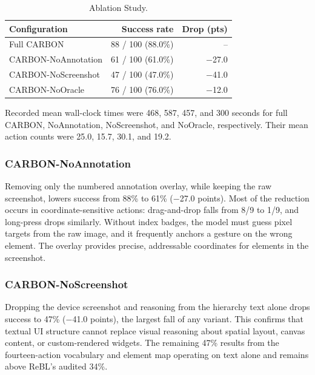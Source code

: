 \documentclass[10pt,conference,a4paper]{IEEEtran}
\begin{document}
  \begin{table}[t]
  \caption{Ablation Study.}
  \label{tab:ablation}
  \centering
  \small
  \setlength{\tabcolsep}{4pt}
  \renewcommand{\arraystretch}{1.25}
  \begin{tabular*}{\columnwidth}{@{\extracolsep{\fill}}lrr@{}}
  \toprule
  \textbf{Configuration} & \textbf{Success rate} & \textbf{Drop (pts)} \\
  \midrule
  Full CARBON              & 88 / 100 (88.0\%) & -- \\
  \quad CARBON-NoAnnotation & 61 / 100 (61.0\%) & $-$27.0 \\
  \quad CARBON-NoScreenshot & 47 / 100 (47.0\%) & $-$41.0 \\
  \quad CARBON-NoOracle     & 76 / 100 (76.0\%) & $-$12.0 \\
  \bottomrule
  \end{tabular*}
  \end{table}

  Recorded mean wall-clock times were 468, 587, 457, and 300 seconds for
  full CARBON, NoAnnotation, NoScreenshot, and NoOracle, respectively. Their
  mean action counts were 25.0, 15.7, 30.1, and 19.2.

  \subsubsection{CARBON-NoAnnotation}
  Removing only the numbered annotation overlay, while keeping the raw
  screenshot, lowers success from 88\% to 61\% ($-$27.0 points). Most of
  the reduction occurs in coordinate-sensitive actions: drag-and-drop falls from
  8/9 to 1/9, and long-press drops similarly. Without index badges, the
  model must guess pixel targets from the raw image, and it frequently
  anchors a gesture on the wrong element. The overlay provides precise,
  addressable coordinates for elements in the screenshot.

  \subsubsection{CARBON-NoScreenshot}
  Dropping the device screenshot and reasoning from the
  hierarchy text alone drops success to 47\% ($-$41.0 points), the
  largest fall of any variant. This confirms that textual UI structure
  cannot replace visual reasoning about spatial layout, canvas content,
  or custom-rendered widgets. The remaining 47\% results from the
  fourteen-action vocabulary and element map operating on text alone and
  remains above ReBL's audited 34\%.
\end{document}
